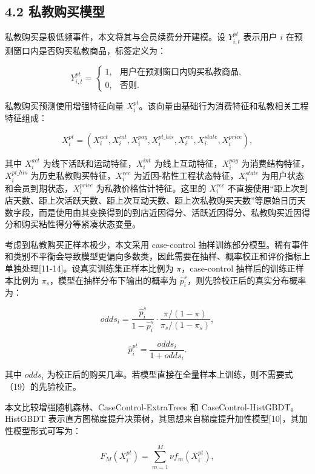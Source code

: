 \documentclass[
  12pt,
]{ctexart}
\begin{document}
\hypertarget{ux79c1ux6559ux8d2dux4e70ux6a21ux578b}{%
\subsection{4.2 私教购买模型}\label{ux79c1ux6559ux8d2dux4e70ux6a21ux578b}}

私教购买是极低频事件，本文将其与会员续费分开建模。设 \(Y_{i,t}^{pt}\) 表示用户 \(i\) 在预测窗口内是否购买私教商品，标签定义为：

\[
Y_{i,t}^{pt}=
\begin{cases}
1, & \text{用户在预测窗口内购买私教商品},\\
0, & \text{否则}.
\end{cases}
\tag{17}
\]

私教购买预测使用增强特征向量 \(X_i^{pt}\)。该向量由基础行为消费特征和私教相关工程特征组成：

\[
X_i^{pt}=\left(X_i^{act},X_i^{int},X_i^{pay},X_i^{pt\_his},X_i^{rec},X_i^{state},X_i^{price}\right),
\tag{18}
\]

其中 \(X_i^{act}\) 为线下活跃和运动特征，\(X_i^{int}\) 为线上互动特征，\(X_i^{pay}\) 为消费结构特征，\(X_i^{pt\_his}\) 为历史私教购买特征，\(X_i^{rec}\) 为近因-粘性工程状态特征，\(X_i^{state}\) 为用户状态和会员到期状态，\(X_i^{price}\) 为私教价格估计特征。这里的 \(X_i^{rec}\) 不直接使用``距上次到店天数、距上次活跃天数、距上次互动天数、距上次私教购买天数''等原始日历天数字段，而是使用由其变换得到的到店近因得分、活跃近因得分、私教购买近因得分和购买粘性得分等紧凑状态变量。

考虑到私教购买正样本极少，本文采用 case-control 抽样训练部分模型。稀有事件和类别不平衡会导致模型更偏向多数类，因此需要在抽样、概率校正和评价指标上单独处理{[}11-14{]}。设真实训练集正样本比例为 \(\pi\)，case-control 抽样后的训练正样本比例为 \(\pi_s\)，模型在抽样分布下输出的概率为 \(\hat p_i^{s}\)，则先验校正后的真实分布概率为：

\[
odds_i=\frac{\hat p_i^{s}}{1-\hat p_i^{s}}\cdot
\frac{\pi/(1-\pi)}{\pi_s/(1-\pi_s)},
\tag{19}
\]

\[
\hat p_i^{pt}=\frac{odds_i}{1+odds_i}.
\tag{20}
\]

其中 \(odds_i\) 为校正后的购买几率。若模型直接在全量样本上训练，则不需要式（19）的先验校正。

本文比较增强随机森林、CaseControl-ExtraTrees 和 CaseControl-HistGBDT。HistGBDT 表示直方图梯度提升决策树，其思想来自梯度提升加性模型{[}10{]}，其加性模型形式可写为：

\[
F_M(X_i^{pt})=\sum_{m=1}^{M}\nu f_m(X_i^{pt}),
\tag{21}
\]
\end{document}
